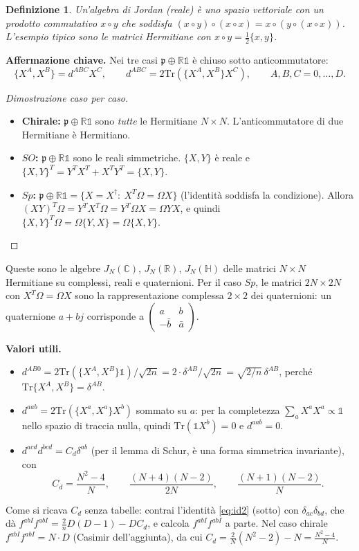 \documentclass[11pt,a4paper]{article}
\numberwithin{equation}{section}
\newtheorem{defi}{Definizione}
\theoremstyle{remark}
\newcommand{\Tr}{\mathrm{Tr}}
\newcommand{\p}{\mathfrak{p}}
\newcommand{\one}{\mathbb{1}}
\newcommand{\R}{\mathbb{R}}
\newcommand{\C}{\mathbb{C}}
\newcommand{\HH}{\mathbb{H}}
\begin{document}
\begin{defi}
Un'algebra di Jordan (reale) è uno spazio vettoriale con un prodotto commutativo $x\circ y$ che soddisfa $(x\circ y)\circ(x\circ x)=x\circ(y\circ(x\circ x))$. L'esempio tipico sono le matrici Hermitiane con $x\circ y=\frac12\{x,y\}$.
\end{defi}

\textbf{Affermazione chiave.} Nei tre casi $\p\oplus\R\one$ è chiuso sotto anticommutatore:
\begin{equation}
\{X^A,X^B\}=d^{ABC}X^C,\qquad d^{ABC}=2\Tr(\{X^A,X^B\}X^C),\qquad A,B,C=0,\dots,D .
\label{eq:jordan}
\end{equation}
\begin{proof}[Dimostrazione caso per caso]
\begin{itemize}
\item \textbf{Chirale:} $\p\oplus\R\one$ sono \emph{tutte} le Hermitiane $N\times N$. L'anticommutatore di due Hermitiane è Hermitiano. \checkmark
\item \textbf{$SO$:} $\p\oplus\R\one$ sono le reali simmetriche. $\{X,Y\}$ è reale e $\{X,Y\}^T=Y^TX^T+X^TY^T=\{X,Y\}$. \checkmark
\item \textbf{$Sp$:} $\p\oplus\R\one=\{X=X^\dagger:\ X^T\Omega=\Omega X\}$ (l'identità soddisfa la condizione). Allora $(XY)^T\Omega=Y^TX^T\Omega=Y^T\Omega X=\Omega YX$, e quindi $\{X,Y\}^T\Omega=\Omega\{Y,X\}=\Omega\{X,Y\}$. \checkmark\qedhere
\end{itemize}
\end{proof}
Queste sono le algebre $J_N(\C)$, $J_N(\R)$, $J_N(\HH)$ delle matrici $N\times N$ Hermitiane su complessi, reali e quaternioni. Per il caso $Sp$, le matrici $2N\times2N$ con $X^T\Omega=\Omega X$ sono la rappresentazione complessa $2\times2$ dei quaternioni: un quaternione $a+bj$ corrisponde a $\begin{pmatrix}a&b\\-\bar b&\bar a\end{pmatrix}$.

\textbf{Valori utili.}
\begin{itemize}
\item $d^{AB0}=2\Tr(\{X^A,X^B\}\one)/\sqrt{2n}=2\cdot\delta^{AB}/\sqrt{2n}=\sqrt{2/n}\,\delta^{AB}$, perché $\Tr\{X^A,X^B\}=\delta^{AB}$.
\item $d^{aab}=2\Tr(\{X^a,X^a\}X^b)$ sommato su $a$: per la completezza $\sum_aX^aX^a\propto\one$ nello spazio di traccia nulla, quindi $\Tr(\one X^b)=0$ e $d^{aab}=0$.
\item $d^{acd}d^{bcd}=C_d\delta^{ab}$ (per il lemma di Schur, è una forma simmetrica invariante), con
\begin{equation}
C_d=\frac{N^2-4}{N},\qquad\frac{(N+4)(N-2)}{2N},\qquad\frac{(N+1)(N-2)}{N}.
\end{equation}
\end{itemize}
Come si ricava $C_d$ senza tabelle: contrai l'identità \eqref{eq:id2} (sotto) con $\delta_{ac}\delta_{bd}$, che dà $f^{abI}f^{abI}=\frac2nD(D-1)-DC_d$, e calcola $f^{abI}f^{abI}$ a parte. Nel caso chirale $f^{abI}f^{abI}=N\cdot D$ (Casimir dell'aggiunta), da cui $C_d=\frac2N(N^2-2)-N=\frac{N^2-4}{N}$. \checkmark
\end{document}
